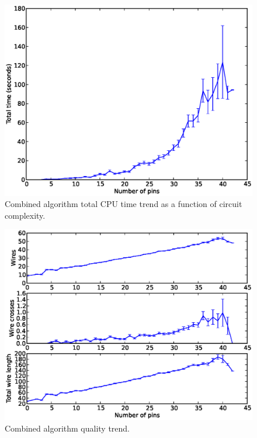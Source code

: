 \begin{figure}[H]
\begin{center}
\includegraphics[width=\textwidth]{Images/final_algorithm_time_trend.eps}
\caption{Combined algorithm total CPU time trend as a function of circuit
complexity.}
\label{fig:final_time_trend}
\end{center}
\end{figure}

\begin{figure}[H]
\begin{center}
\includegraphics[width=\textwidth]{Images/final_algorithm_quality_trend.eps}
\caption{Combined algorithm quality trend.}
\label{fig:final_quality_trend}
\end{center}
\end{figure}

